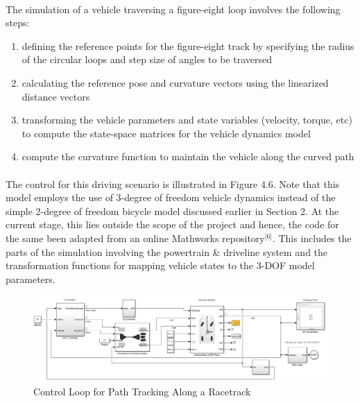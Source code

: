\paragraph{}
The simulation of a vehicle traversing a figure-eight loop involves the following steps:
\begin{enumerate}[label = (\arabic*), itemsep=-0.3em]
    \item defining the reference points for the figure-eight track by specifying the radius of the circular loops and step size of angles to be traversed
    \item calculating the reference pose and curvature vectors using the linearized distance vectors
    \item transforming the vehicle parameters and state variables (velocity, torque, etc) to compute the state-space matrices for the vehicle dynamics model
    \item compute the curvature function to maintain the vehicle along the curved path
\end{enumerate}

\paragraph{}
The control for this driving scenario is illustrated in Figure 4.6. Note that this model employs the use of 3-degree of freedom vehicle dynamics instead of the simple 2-degree of freedom bicycle model discussed earlier in Section 2. At the current stage, this lies outside the scope of the project and hence, the code for the same been adapted from an online Mathworks repository$^{\text{[6]}}$. This includes the parts of the simulation involving the powertrain \& driveline system and the transformation functions for mapping vehicle states to the 3-DOF model parameters. 

\begin{figure}[H]\label{fig4.6}
\centering \includegraphics[width=\textwidth]{Images/figure_eight_model.png}
\caption{Control Loop for Path Tracking Along a Racetrack}
\end{figure}


